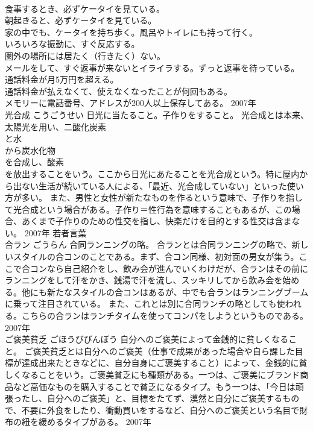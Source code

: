 \documentclass[8pt]{extreport}
\begin{document}
\begin{CJK}{UTF8}{min}
\\	食事するとき、必ずケータイを見ている。 
\\	朝起きると、必ずケータイを見ている。 
\\	家の中でも、ケータイを持ち歩く。風呂やトイレにも持って行く。 
\\	いろいろな振動に、すぐ反応する。 
\\	圏外の場所には居たく（行きたく）ない。 
\\	メールをして、すぐ返事が来ないとイライラする。ずっと返事を待っている。 
\\	通話料金が月5万円を超える。 
\\	通話料金が払えなくて、使えなくなったことが何回もある。 
\\	メモリーに電話番号、アドレスが200人以上保存してある。	2007年	
\\	光合成	こうごうせい	日光に当たること。子作りをすること。	光合成とは本来、太陽光を用い、二酸化炭素
\\	と水
\\	から炭水化物
\\	を合成し、酸素
\\	を放出することをいう。ここから日光にあたることを光合成という。特に屋内から出ない生活が続いている人による、「最近、光合成していない」といった使い方が多い。 また、男性と女性が新たなものを作るという意味で、子作りを指して光合成という場合がある。子作り＝性行為を意味することもあるが、この場合、あくまで子作りのための性交を指し、快楽だけを目的とする性交は含まない。	2007年	若者言葉	
\\	合ラン	ごうらん	合同ランニングの略。	合ランとは合同ランニングの略で、新しいスタイルの合コンのことである。まず、合コン同様、初対面の男女が集う。ここで合コンなら自己紹介をし、飲み会が進んでいくわけだが、合ランはその前にランニングをして汗をかき、銭湯で汗を流し、スッキリしてから飲み会を始める。他にも新たなスタイルの合コンはあるが、中でも合ランはランニングブームに乗って注目されている。 また、これとは別に合同ランチの略としても使われる。こちらの合ランはランチタイムを使ってコンパをしようというものである。	2007年	
\\	ご褒美貧乏	ごほうびびんぼう	自分へのご褒美によって金銭的に貧しくなること。	ご褒美貧乏とは自分へのご褒美（仕事で成果があった場合や自ら課した目標が達成出来たときなどに、自分自身にご褒美すること）によって、金銭的に貧しくなることをいう。ご褒美貧乏にも種類がある。一つは、ご褒美にブランド商品など高価なものを購入することで貧乏になるタイプ。もう一つは、「今日は頑張ったし、自分へのご褒美」と、目標をたてず、漠然と自分にご褒美するもので、不要に外食をしたり、衝動買いをするなど、自分へのご褒美という名目で財布の紐を緩めるタイプがある。	2007年	

\end{CJK}
\end{document}
